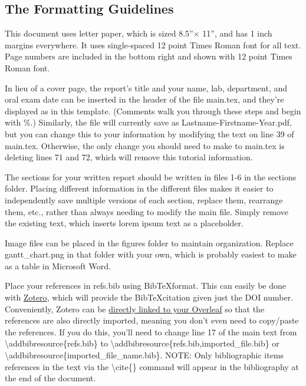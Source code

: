 \subsection{The Formatting Guidelines}
\label{subsec:format}

This document uses letter paper, which is sized 8.5''$\times$ 11'', and has 1 inch margins everywhere. It uses single-spaced 12 point Times Roman font for all text. Page numbers are included in the bottom right and shown with 12 point Times Roman font. 

In lieu of a cover page, the report's title and your name, lab, department, and oral exam date can be inserted in the header of the file main.tex, and they're displayed as in this template. (Comments walk you through these steps and begin with \%.) Similarly, the file will currently save as Lastname-Firstname-Year.pdf, but you can change this to your information by modifying the text on line 39 of main.tex. Otherwise, the only change you should need to make to main.tex is deleting lines 71 and 72, which will remove this tutorial information. 

The sections for your written report should be written in files 1-6 in the sections folder. Placing different information in the different files makes it easier to independently save multiple versions of each section, replace them, rearrange them, etc., rather than always needing to modify the main file. Simply remove the existing text, which inserts lorem ipsum text as a placeholder. 

Image files can be placed in the figures folder to maintain organization. Replace gantt\_chart.png in that folder with your own, which is probably easiest to make as a table in Microsoft Word. 

Place your references in refs.bib using Bib\TeX format. This can easily be done with \href{https://www.zotero.org/}{Zotero}, which will provide the Bib\TeX citation given just the DOI number. Conveniently, Zotero can be \href{https://www.overleaf.com/learn/how-to/How_to_link_your_Overleaf_account_to_Mendeley_and_Zotero}{directly linked to your Overleaf} so that the references are also directly imported, meaning you don't even need to copy/paste the references. If you do this, you'll need to change line 17 of the main text from \textbackslash addbibresource\{refs.bib\} to \textbackslash addbibresource\{refs.bib,imported\_file.bib\} or \textbackslash addbibresource\{imported\_file\_name.bib\}. NOTE: Only bibliographic items references in the text via the \textbackslash cite\{\} command will appear in the bibliography at the end of the document. 


